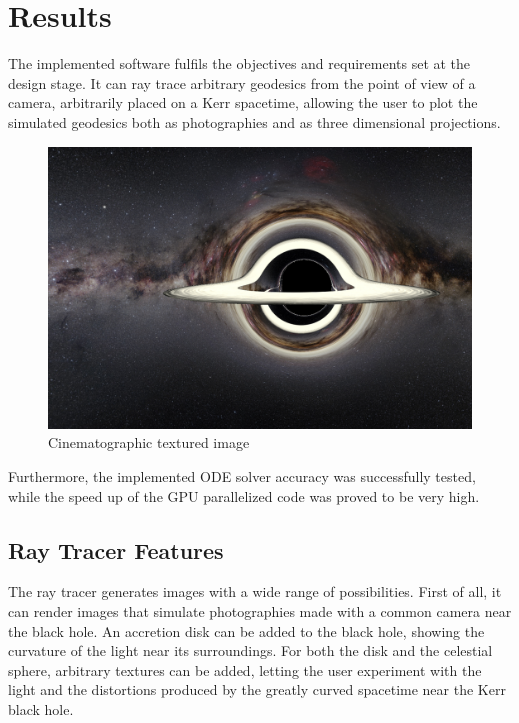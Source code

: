 \chapter{Results}
\label{chapter:results}

The implemented software fulfils the objectives and requirements set at the design stage. It can ray trace arbitrary geodesics from the point of view of a camera, arbitrarily placed on a Kerr spacetime, allowing the user to plot the simulated geodesics both as photographies and as three dimensional projections.

\begin{figure}[bth]
	\myfloatalign
	\includegraphics[width=\linewidth]{gfx/bh_texture_disk}
	\caption[Cinematographic textured image]{Cinematographic textured image}
	\label{fig:blackhole}
\end{figure}

Furthermore, the implemented \ac{ODE} solver accuracy was successfully tested, while the speed up of the \ac{GPU} parallelized code was proved to be very high.

\section{Ray Tracer Features}

The ray tracer generates images with a wide range of possibilities. First of all, it can render images that simulate photographies made with a common camera near the black hole. An accretion disk can be added to the black hole, showing the curvature of the light near its surroundings. For both the disk and the celestial sphere, arbitrary textures can be added, letting the user experiment with the light and the distortions produced by the greatly curved spacetime near the Kerr black hole.

